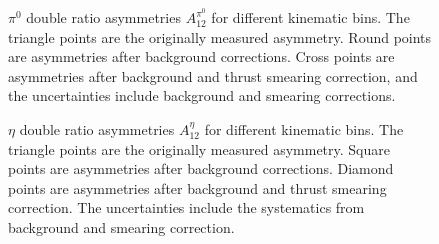 \begin{figure}[H]
  \caption{$\pi^0$ double ratio asymmetries $A^{\pi^0}_{12}$ for different kinematic bins. The triangle points are the originally measured asymmetry. Round points are asymmetries after background corrections. Cross points are asymmetries after background and thrust smearing correction, and the uncertainties include background and smearing corrections.}
  \label{fig:pi0result}
\end{figure}

\begin{figure}[H]
  \centering     
  \caption{$\eta$ double ratio asymmetries $A^{\eta}_{12}$ for different kinematic bins. The triangle points are the originally measured asymmetry. Square points are asymmetries after background corrections. Diamond points are asymmetries after background and thrust smearing correction. The uncertainties include the systematics from background and smearing correction.}
  \label{fig:etaresult}
\end{figure}


